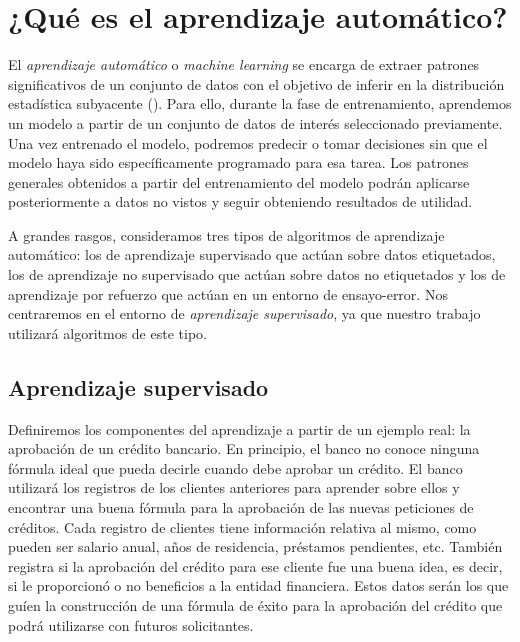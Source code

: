 \documentclass[oneside,openright,titlepage,numbers=noenddot,openany,headinclude,footinclude=true,
cleardoublepage=empty,abstractoff,BCOR=5mm,paper=a4,fontsize=12pt,main=spanish]{scrreprt}
\begin{document}
\section{¿Qué es el aprendizaje automático?}

\label{sec:queaprendizaje}

El \textit{aprendizaje automático} o \textit{machine learning} se encarga de extraer patrones significativos de un conjunto de datos con el objetivo de inferir en la distribución estadística subyacente (\cite{pattern2006}). Para ello, durante la fase de entrenamiento, aprendemos un modelo a partir de un conjunto de datos de interés seleccionado previamente. Una vez entrenado el modelo, podremos predecir o tomar decisiones sin que el modelo haya sido específicamente programado para esa tarea. Los patrones generales obtenidos a partir del entrenamiento del modelo podrán aplicarse posteriormente a datos no vistos y seguir obteniendo resultados de utilidad. 

A grandes rasgos, consideramos tres tipos de algoritmos de aprendizaje automático: los de aprendizaje supervisado que actúan sobre datos etiquetados, los de aprendizaje no supervisado que actúan sobre datos no etiquetados y los de aprendizaje por refuerzo que actúan en un entorno de ensayo-error. Nos centraremos en el entorno de \textit{aprendizaje supervisado}, ya que nuestro trabajo utilizará algoritmos de este tipo. 

\subsection{Aprendizaje supervisado} \label{subsec:ejemplobanco}

Definiremos los componentes del aprendizaje a partir de un ejemplo real: la aprobación de un crédito bancario. En principio, el banco no conoce ninguna fórmula ideal que pueda decirle cuando debe aprobar un crédito. El banco utilizará los registros de los clientes anteriores para aprender sobre ellos y encontrar una buena fórmula para la aprobación de las nuevas peticiones de créditos. Cada registro de clientes tiene información relativa al mismo, como pueden ser salario anual, años de residencia, préstamos pendientes, etc. También registra si la aprobación del crédito para ese cliente fue una buena idea, es decir, si le proporcionó o no beneficios a la entidad financiera. Estos datos serán los que guíen la construcción de una fórmula de éxito para la aprobación del crédito que podrá utilizarse con futuros solicitantes.
\end{document}
